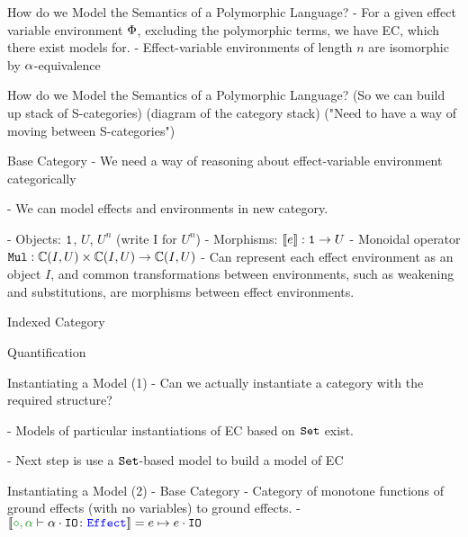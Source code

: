\documentclass{beamer}
\begin{document}
\begin{frame}{How do we Model the Semantics of a Polymorphic Language?}
    - For a given effect variable environment $\P$, excluding the polymorphic terms, we have EC, which there exist models for.
    - Effect-variable environments of length $n$ are isomorphic by $\a$-equivalence
\end{frame}

\begin{frame}{How do we Model the Semantics of a Polymorphic Language?}
(So we can build up stack of S-categories)
(diagram of the category stack)
("Need to have a way of moving between S-categories")
\end{frame}

\begin{frame}{Base Category}
    - We need a way of reasoning about effect-variable environment categorically

    - We can model effects and environments in new category.

    - Objects: $\1$, $U$, $U^n$ (write I for $U^n$)
    - Morphisms: $\deno{e}: \1\rightarrow U$
    - Monoidal operator $\Mul: \ciu\times\ciu\rightarrow\ciu$
    - Can represent each effect environment as an object $I$, and common transformations between environments, such as weakening and substitutions, are morphisms between effect environments.
\end{frame}

\begin{frame}{Indexed Category}
    
\end{frame}

\begin{frame}{Quantification}

\end{frame}
    
\begin{frame}{Instantiating a Model (1)}
    - Can we actually instantiate a category with the required structure?

    - Models of particular instantiations of EC based on $\set$ exist.

    - Next step is use a $\set$-based model to build a model of EC
\end{frame}

\begin{frame}{Instantiating a Model (2) - Base Category}
    - Category of monotone functions of ground effects (with no variables) to ground effects.
    - $\deno{\typerelation{\nil,\a}{\a\dot\texttt{IO}}{\effect}} = e\mapsto e\dot\texttt{IO}$
\end{frame}
\end{document}
